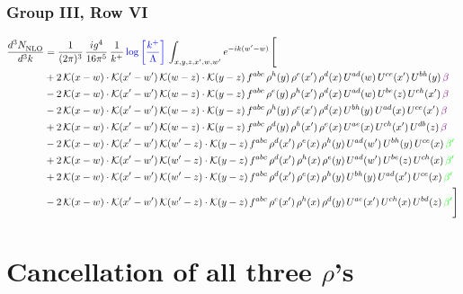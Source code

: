 \documentclass[9pt]{article}
\numberwithin{equation}{section}
\begin{document}
\subsubsection{Group III, Row VI}
\begin{align}
     \frac{d^{3}N_{\rm NLO}^{\rm}}{d^{3}k}  & = \frac{1}{(2\pi)^{3}}\, \frac{ig^{4}}{16\pi^{5}}\, \frac{1}{k^{+}}\, {\color{blue}\log{\left[\frac{k^{+}}{\Lambda}\right]}}\,\int_{x,y,z,x^{\prime},w,w^{\prime}}e^{-ik(w^{\prime}-w)}\, \Bigg[\notag \\ & +2\,\mathcal{K}(x-w)\cdot\mathcal{K}(x'-w')\,\mathcal{K}(w-z)\cdot\mathcal{K}(y-z)\, f^{abc}\,\rho^{h}(y)\,\rho^{e}(x')\,\rho^{d}(x)\,U^{ad}(w)\,U^{ce}(x')\,U^{bh}(y)\,{\color{violet} \beta}\notag\\ &-2\,\mathcal{K}(x-w)\cdot\mathcal{K}(x'-w')\,\mathcal{K}(w-z)\cdot\mathcal{K}(y-z)\, f^{abc}\,\rho^{e}(y)\,\rho^{h}(x')\,\rho^{d}(x)\,U^{ad}(w)\,U^{be}(z)\,U^{ch}(x')\,{\color{violet} \beta}\notag \\ &-2\,\mathcal{K}(x-w)\cdot\mathcal{K}(x'-w')\,\mathcal{K}(w-z)\cdot\mathcal{K}(y-z)\, f^{abc}\,\rho^{h}(y)\,\rho^{e}(x')\,\rho^{d}(x)\,U^{bh}(y)\,U^{ad}(x)\,U^{ce}(x')\,{\color{violet} \beta}\notag\\ & +2\,\mathcal{K}(x-w)\cdot\mathcal{K}(x'-w')\,\mathcal{K}(w-z)\cdot\mathcal{K}(y-z)\, f^{abc}\,\rho^{d}(y)\,\rho^{h}(x')\,\rho^{e}(x)\,U^{ae}(x)\,U^{ch}(x')\,U^{db}(z)\,{\color{violet} \beta}\notag\\ & -2\, \mathcal{K}(x-w) \cdot \mathcal{K}(x'-w')\, \mathcal{K}(w'-z) \cdot \mathcal{K}(y-z)\, f^{abc}\, \rho^{d}(x')\,\rho^{e}(x)\, \rho^{h}(y)\,U^{ad}(w')\,U^{bh}(y)\,U^{ce}(x)\, {\color{green} \beta'}\notag \\ & + 2\, \mathcal{K}(x-w) \cdot \mathcal{K}(x'-w')\, \mathcal{K}(w'-z) \cdot \mathcal{K}(y-z)\, f^{abc}\, \rho^{d}(x')\,\rho^{h}(x)\, \rho^{e}(y)\,U^{ad}(w')\,U^{be}(z)\,U^{ch}(x)\, {\color{green} \beta'}\notag \\ & +2\, \mathcal{K}(x-w) \cdot \mathcal{K}(x'-w')\, \mathcal{K}(w'-z) \cdot \mathcal{K}(y-z)\, f^{abc}\, \rho^{d}(x')\,\rho^{e}(x)\, \rho^{h}(y)\,U^{bh}(y)\,U^{ad}(x')\,U^{ce}(x)\, {\color{green} \beta'}\notag \\ & -2\, \mathcal{K}(x-w) \cdot \mathcal{K}(x'-w')\, \mathcal{K}(w'-z) \cdot \mathcal{K}(y-z)\, f^{abc}\, \rho^{e}(x')\,\rho^{h}(x)\, \rho^{d}(y)\,U^{ae}(x')\,U^{ch}(x)\,U^{bd}(z)\, {\color{green} \beta'}\Bigg]
\end{align}  
\section{Cancellation of all three $\rho$'s}
\end{document}
